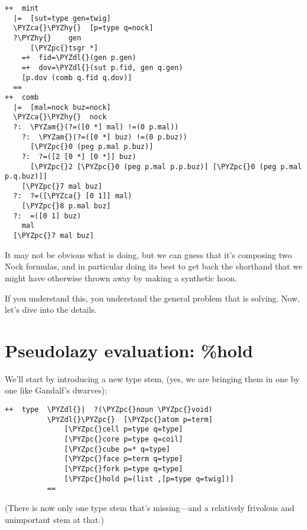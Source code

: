 \begin{framed_shaded}
\begin{Verbatim}[fontsize=\relsize{-2.5},fontseries=b,commandchars=\\\{\}]
++  mint
  |=  [sut=type gen=twig]
  \PYZca{}\PYZhy{}  [p=type q=nock]
  ?\PYZhy{}    gen
      [\PYZpc{}tsgr *]
    =+  fid=\PYZdl{}(gen p.gen)
    =+  dov=\PYZdl{}(sut p.fid, gen q.gen)
    [p.dov (comb q.fid q.dov)]
  ==
++  comb
  |=  [mal=nock buz=nock]
  \PYZca{}\PYZhy{}  nock
  ?:  \PYZam{}(?=([0 *] mal) !=(0 p.mal))
    ?:  \PYZam{}(?=([0 *] buz) !=(0 p.buz))
      [\PYZpc{}0 (peg p.mal p.buz)]
    ?:  ?=([2 [0 *] [0 *]] buz)
      [\PYZpc{}2 [\PYZpc{}0 (peg p.mal p.p.buz)] [\PYZpc{}0 (peg p.mal p.q.buz)]]
    [\PYZpc{}7 mal buz]
  ?:  ?=([\PYZca{} [0 1]] mal)
    [\PYZpc{}8 p.mal buz]
  ?:  =([0 1] buz)
    mal
  [\PYZpc{}7 mal buz]
\end{Verbatim}
\end{framed_shaded}
It may not be obvious what  is doing, but we can guess
that it's composing two Nock formulas, and in particular doing
its best to get back the  shorthand that we might have
otherwise thrown away by making \kode{=+} a synthetic hoon.

If you understand this, you understand the general problem that
 is solving.  Now, let's dive into the details.

\section{Pseudolazy evaluation: \%hold}

We'll start by introducing a new type stem,  (yes, we are
bringing them in one by one like Gandalf's dwarves):

\begin{framed_shaded}
\begin{Verbatim}[fontsize=\relsize{-2.5},fontseries=b,commandchars=\\\{\}]
++  type  \PYZdl{}|  ?(\PYZpc{}noun \PYZpc{}void)
          \PYZdl{}\PYZpc{}  [\PYZpc{}atom p=term]
              [\PYZpc{}cell p=type q=type]
              [\PYZpc{}core p=type q=coil]
              [\PYZpc{}cube p=* q=type]
              [\PYZpc{}face p=term q=type]
              [\PYZpc{}fork p=type q=type]
              [\PYZpc{}hold p=(list ,[p=type q=twig])]
          ==
\end{Verbatim}
\end{framed_shaded}
(There is now only one type stem that's missing---and a
relatively frivolous and unimportant stem at that.)

